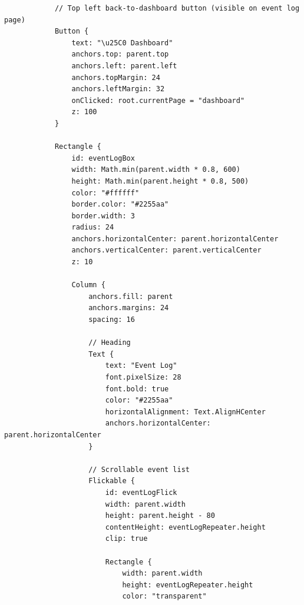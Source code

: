 \documentclass{report}
\begin{document}
\begin{lstlisting}
            // Top left back-to-dashboard button (visible on event log page)
            Button {
                text: "\u25C0 Dashboard"
                anchors.top: parent.top
                anchors.left: parent.left
                anchors.topMargin: 24
                anchors.leftMargin: 32
                onClicked: root.currentPage = "dashboard"
                z: 100
            }

            Rectangle {
                id: eventLogBox
                width: Math.min(parent.width * 0.8, 600)
                height: Math.min(parent.height * 0.8, 500)
                color: "#ffffff"
                border.color: "#2255aa"
                border.width: 3
                radius: 24
                anchors.horizontalCenter: parent.horizontalCenter
                anchors.verticalCenter: parent.verticalCenter
                z: 10

                Column {
                    anchors.fill: parent
                    anchors.margins: 24
                    spacing: 16

                    // Heading
                    Text {
                        text: "Event Log"
                        font.pixelSize: 28
                        font.bold: true
                        color: "#2255aa"
                        horizontalAlignment: Text.AlignHCenter
                        anchors.horizontalCenter: parent.horizontalCenter
                    }

                    // Scrollable event list
                    Flickable {
                        id: eventLogFlick
                        width: parent.width
                        height: parent.height - 80
                        contentHeight: eventLogRepeater.height
                        clip: true

                        Rectangle {
                            width: parent.width
                            height: eventLogRepeater.height
                            color: "transparent"


\end{lstlisting}
\end{document}
